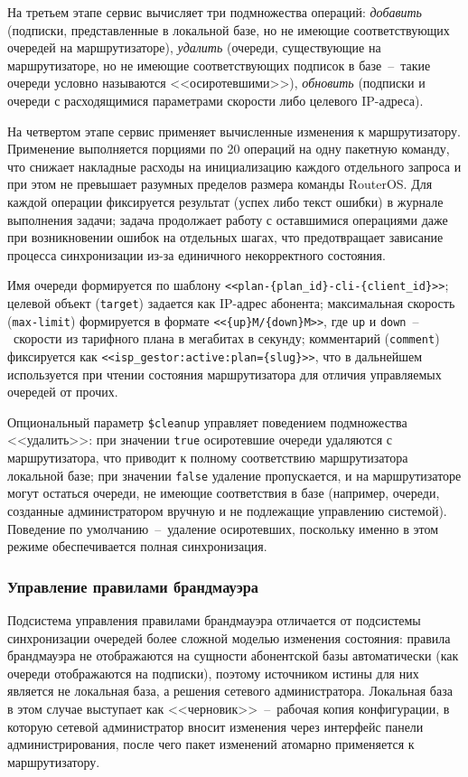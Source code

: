На третьем этапе сервис вычисляет три подмножества операций: \emph{добавить} (подписки, представленные в локальной базе, но не имеющие соответствующих очередей на маршрутизаторе), \emph{удалить} (очереди, существующие на маршрутизаторе, но не имеющие соответствующих подписок в базе~--~такие очереди условно называются <<осиротевшими>>), \emph{обновить} (подписки и очереди с расходящимися параметрами скорости либо целевого IP-адреса).

На четвертом этапе сервис применяет вычисленные изменения к маршрутизатору. Применение выполняется порциями по 20 операций на одну пакетную команду, что снижает накладные расходы на инициализацию каждого отдельного запроса и при этом не превышает разумных пределов размера команды RouterOS. Для каждой операции фиксируется результат (успех либо текст ошибки) в журнале выполнения задачи; задача продолжает работу с оставшимися операциями даже при возникновении ошибок на отдельных шагах, что предотвращает зависание процесса синхронизации из-за единичного некорректного состояния.

Имя очереди формируется по шаблону \texttt{<<plan-\{plan\_id\}-cli-\{client\_id\}>>}; целевой объект (\texttt{target}) задается как IP-адрес абонента; максимальная скорость (\texttt{max-limit}) формируется в формате \texttt{<<\{up\}M/\{down\}M>>}, где \texttt{up} и \texttt{down}~--~скорости из тарифного плана в мегабитах в секунду; комментарий (\texttt{comment}) фиксируется как \texttt{<<isp\_gestor:active:plan=\{slug\}>>}, что в дальнейшем используется при чтении состояния маршрутизатора для отличия управляемых очередей от прочих.

Опциональный параметр \texttt{\$cleanup} управляет поведением подмножества <<удалить>>: при значении \texttt{true} осиротевшие очереди удаляются с маршрутизатора, что приводит к полному соответствию маршрутизатора локальной базе; при значении \texttt{false} удаление пропускается, и на маршрутизаторе могут остаться очереди, не имеющие соответствия в базе (например, очереди, созданные администратором вручную и не подлежащие управлению системой). Поведение по умолчанию~--~удаление осиротевших, поскольку именно в этом режиме обеспечивается полная синхронизация.

\subsubsection{Управление правилами брандмауэра}

Подсистема управления правилами брандмауэра отличается от подсистемы синхронизации очередей более сложной моделью изменения состояния: правила брандмауэра не отображаются на сущности абонентской базы автоматически (как очереди отображаются на подписки), поэтому источником истины для них является не локальная база, а решения сетевого администратора. Локальная база в этом случае выступает как <<черновик>>~--~рабочая копия конфигурации, в которую сетевой администратор вносит изменения через интерфейс панели администрирования, после чего пакет изменений атомарно применяется к маршрутизатору.

